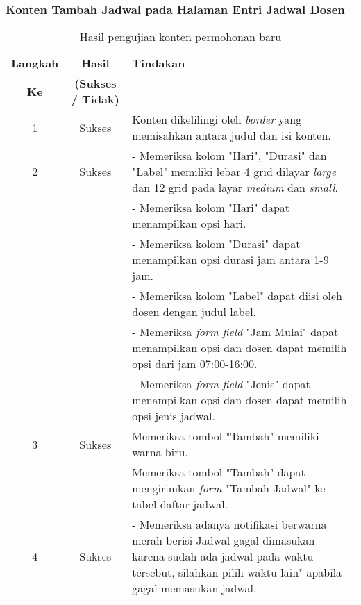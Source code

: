 \subsubsection{Konten Tambah Jadwal pada Halaman Entri Jadwal Dosen}
\begin{table}[H]
	\centering 
	\caption{Hasil pengujian konten permohonan baru}
	\label{hasil:TambahJadwal}
	\begin{tabular}{|c| c| p{}|}
		\toprule
		\textbf{Langkah} & \textbf{Hasil} & \textbf{Tindakan}\\
		\textbf{Ke} & \textbf{(Sukses / Tidak)} &\\
		\midrule
		1&Sukses&Konten dikelilingi oleh \textit{border} yang memisahkan antara judul dan isi konten.\\
		\hline
		2&Sukses& - Memeriksa kolom "Hari", "Durasi" dan "Label" memiliki lebar 4 grid dilayar \textit{large} dan 12 grid pada layar \textit{medium} dan \textit{small}.\\
		&& - Memeriksa kolom "Hari" dapat menampilkan opsi hari.\\
		&& - Memeriksa kolom "Durasi" dapat menampilkan opsi durasi jam antara 1-9 jam.\\
		&& - Memeriksa kolom "Label" dapat diisi oleh dosen dengan judul label.\\
		&& - Memeriksa \textit{form field} "Jam Mulai" dapat menampilkan opsi dan dosen dapat memilih opsi dari jam 07:00-16:00.\\
		&& - Memeriksa \textit{form field} "Jenis" dapat menampilkan opsi dan dosen dapat memilih opsi jenis jadwal.\\
		\hline
		3&Sukses&Memeriksa tombol "Tambah" memiliki warna biru.\\
		&&Memeriksa tombol "Tambah" dapat mengirimkan \textit{form} "Tambah Jadwal" ke tabel daftar jadwal.\\
		\hline
		4&Sukses& - Memeriksa adanya notifikasi berwarna merah berisi Jadwal gagal dimasukan karena sudah ada jadwal pada waktu tersebut, silahkan pilih waktu lain" apabila gagal memasukan jadwal.\\		
		\bottomrule		
	\end{tabular} 
\end{table}

